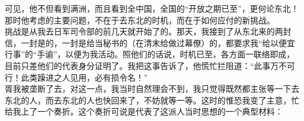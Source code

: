 可见，他不但看到满洲，而且看到全中国，全国的“开放之期已至”，更何论东北！那时他考虑的主要问题，不在于去东北的时机，而在于如何应付的新挑战。\\

挑战是从我去日军司令部的前几天就开始了的。那天，我接到了从东北来的两封信，一封是的，一封是给当秘书的（在清末给做过幕僚）的，都要求我“给以便宜行事”的“手谕”，以便为我活动。照他们的话说，时机已至，各方面一联络即成，目前只差他们的代表身分证明了。我把这事告诉了，他慌忙拦阻道：“此事万不可行！此类躁进之人见用，必有损令名！”\\

胥我被垄断了去，对这一点，我当时自然理会不到，我只觉得既然都主张等一下去东北的人，而去东北的人也快回来了，不妨就等一等。这时的惟恐我变了主意，忙给我上了一个奏折。这个奏折可说是代表了这派人当时思想的一个典型材料：\\

